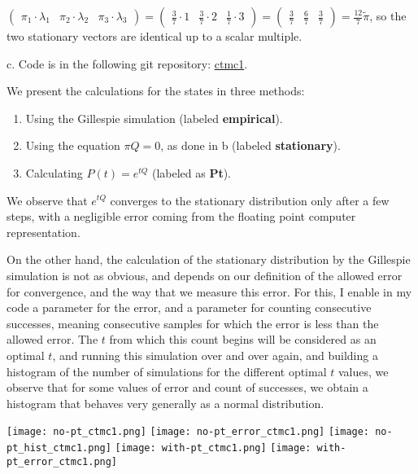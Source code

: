 \documentclass{article}
\begin{document}
$\begin{pmatrix}
    \pi_1\cdot\lambda_1 & \pi_2\cdot\lambda_2 & \pi_3\cdot\lambda_3
\end{pmatrix}=\begin{pmatrix}
    \frac{3}{7}\cdot{1} & \frac{3}{7}\cdot{2} & \frac{1}{7}\cdot{3}
\end{pmatrix}=\begin{pmatrix}
    \frac{3}{7} & \frac{6}{7} & \frac{3}{7}
\end{pmatrix}=\frac{12}{7}\tilde\pi$, so the two stationary vectors are identical up to a scalar multiple.

c. Code is in the following git repository: \href{https://github.com/HaimL76/ctmc1.git}{ctmc1}.

We present the calculations for the states in three methods:
\begin{enumerate}
    \item Using the Gillespie simulation (labeled \textbf{empirical}).
    \item Using the equation $\pi{Q}=0$, as done in b (labeled \textbf{stationary}).
    \item Calculating $P(t)=e^{tQ}$ (labeled as \textbf{Pt}).
\end{enumerate}

We observe that $e^{tQ}$ converges to the stationary distribution only after a few steps, with a negligible error coming from the floating point computer representation. 

On the other hand, the calculation of the stationary distribution by the Gillespie simulation is not as obvious, and depends on our definition of the allowed error for convergence, and the way that we measure this error. For this, I enable in my code a parameter for the error, and a parameter for counting consecutive successes, meaning consecutive samples for which the error is less than the allowed error. The $t$ from which this count begins will be considered as an optimal $t$, and running this simulation over and over again, and building a histogram of the number of simulations for the different optimal $t$ values, we observe that for some values of error and count of successes, we obtain a histogram that behaves very generally as a normal distribution.

\texttt{[image: no-pt\_ctmc1.png]}
\texttt{[image: no-pt\_error\_ctmc1.png]}
\texttt{[image: no-pt\_hist\_ctmc1.png]}
\texttt{[image: with-pt\_ctmc1.png]}
\texttt{[image: with-pt\_error\_ctmc1.png]}
\end{document}
